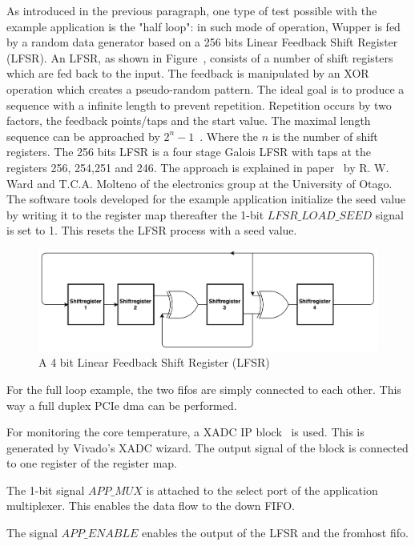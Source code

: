 \newpage
As introduced in the previous paragraph, one type of test possible with the example application is the "half loop": in such mode of operation, Wupper is fed by a random data generator based on a 256 bits Linear Feedback Shift Register (LFSR). An LFSR, as shown in Figure~\cite{lfsr}, consists of a number of shift registers which are fed back to the input. The feedback is manipulated by an XOR operation which creates a pseudo-random pattern. The ideal goal is to produce a sequence with a infinite length to prevent repetition. Repetition occurs by two factors, the feedback points/taps and the start value. The maximal length sequence can be approached by $2^n-1$~\cite{lfsr}. Where the $n$ is the number of shift registers. The 256 bits LFSR is a four stage Galois LFSR with taps at the registers 256, 254,251 and 246. The approach is explained in paper~\cite{lfsrtable} by R. W. Ward and T.C.A. Molteno of the electronics group at the University of Otago.
The software tools developed for the example application initialize the seed value by writing it to the register map thereafter the 1-bit $LFSR\_LOAD\_SEED$ signal is set to 1. This resets the LFSR process with a seed value.

\begin{figure}[h]
	\centering
	\includegraphics[width = 0.8 \textwidth]{figures/lfsr.pdf}	
	\caption{A 4 bit Linear Feedback Shift Register (LFSR)}
	\label{fig:lfsr}
\end{figure}
\newpage
For the full loop example, the two fifos are simply connected to each other. This way a full duplex PCIe dma can be performed.

For monitoring the core temperature, a XADC IP block~\cite{xadc} is used. This is generated by Vivado's XADC wizard. The output signal of the block is connected to one register of the register map.

The 1-bit signal $APP\_MUX$ is attached to the select port of the application multiplexer. This enables the data flow to the down FIFO.

The signal $APP\_ENABLE$ enables the output of the LFSR and the fromhost fifo. 

